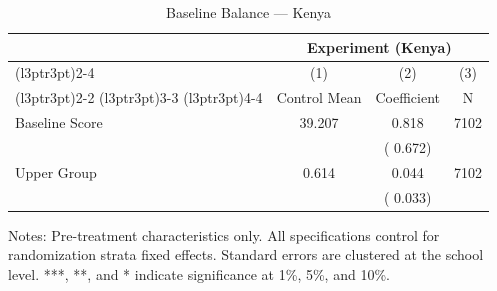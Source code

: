 \begin{table}[H]
\centering
\caption{Baseline Balance --- Kenya}
\label{tab:ke_balance}
\begin{threeparttable}
\begin{tabular}[t]{lccc}
\toprule
\multicolumn{1}{c}{ } & \multicolumn{3}{c}{Experiment (Kenya)} \\
\cmidrule(l{3pt}r{3pt}){2-4}
\multicolumn{1}{c}{ } & \multicolumn{1}{c}{(1)} & \multicolumn{1}{c}{(2)} & \multicolumn{1}{c}{(3)} \\
\cmidrule(l{3pt}r{3pt}){2-2} \cmidrule(l{3pt}r{3pt}){3-3} \cmidrule(l{3pt}r{3pt}){4-4}
 & Control Mean & Coefficient & N \\
\midrule
Baseline Score &  39.207 &   0.818 & 7102 \\
 & & (  0.672) & \\
Upper Group &   0.614 &   0.044 & 7102 \\
 & & (  0.033) & \\
\bottomrule
\end{tabular}
\begin{tablenotes}[para]
\item Notes: Pre-treatment characteristics only. All specifications control for randomization strata fixed effects. Standard errors are clustered at the school level. ***, **, and * indicate significance at 1\%, 5\%, and 10\%.
\end{tablenotes}
\end{threeparttable}
\end{table}
